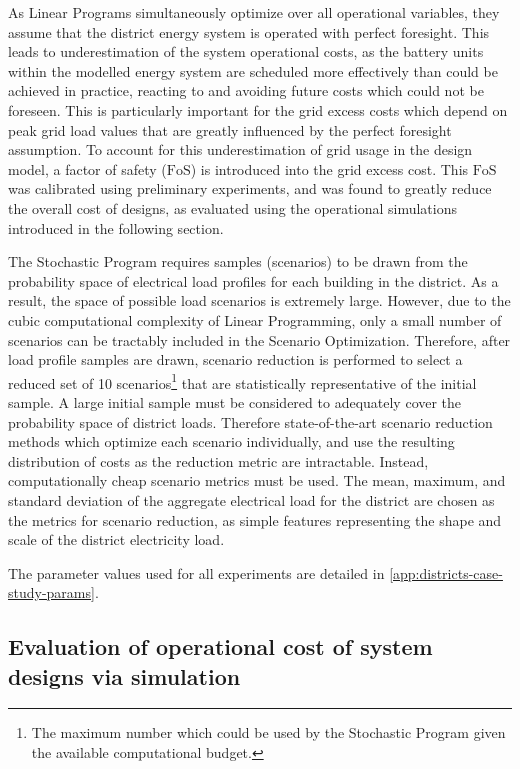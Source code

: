 As Linear Programs simultaneously optimize over all operational variables, they assume that the district energy system is operated with perfect foresight. This leads to underestimation of the system operational costs, as the battery units within the modelled energy system are scheduled more effectively than could be achieved in practice, reacting to and avoiding future costs which could not be foreseen. This is particularly important for the grid excess costs which depend on peak grid load values that are greatly influenced by the perfect foresight assumption. To account for this underestimation of grid usage in the design model, a factor of safety ($\text{FoS}$) is introduced into the grid excess cost. This $\text{FoS}$ was calibrated using preliminary experiments, and was found to greatly reduce the overall cost of designs, as evaluated using the operational simulations introduced in the following section. %

The Stochastic Program requires samples (scenarios) to be drawn from the probability space of electrical load profiles for each building in the district. As a result, the space of possible load scenarios is extremely large. However, due to the cubic computational complexity of Linear Programming, only a small number of scenarios can be tractably included in the Scenario Optimization. Therefore, after load profile samples are drawn, scenario reduction \citep{heitsch2003ScenarioReductionAlgorithms,gioia2023ScenarioReducer} is performed to select a reduced set of 10 scenarios\footnote{The maximum number which could be used by the Stochastic Program given the available computational budget.} that are statistically representative of the initial sample. A large initial sample must be considered to adequately cover the probability space of district loads. Therefore state-of-the-art scenario reduction methods which optimize each scenario individually, and use the resulting distribution of costs as the reduction metric \citep{pickering2019PracticalOptimisationDistrict} are intractable. Instead, computationally cheap scenario metrics must be used. The mean, maximum, and standard deviation of the aggregate electrical load for the district are chosen as the metrics for scenario reduction, as simple features representing the shape and scale of the district electricity load.

The parameter values used for all experiments are detailed in \ref{app:districts-case-study-params}.


\subsection{Evaluation of operational cost of system designs via simulation} \label{sec:districts-sims}

